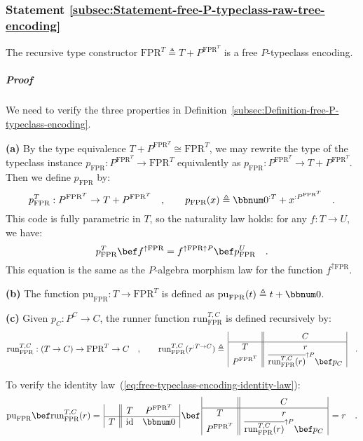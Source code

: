 \subsubsection{Statement \label{subsec:Statement-free-P-typeclass-raw-tree-encoding}\ref{subsec:Statement-free-P-typeclass-raw-tree-encoding}}

The recursive type constructor $\text{FPR}^{T}\triangleq T+P^{\text{FPR}^{T}}$
is a free $P$-typeclass encoding.

\subparagraph{Proof}

We need to verify the three properties in Definition~\ref{subsec:Definition-free-P-typeclass-encoding}.

\textbf{(a)} By the type equivalence $T+P^{\text{FPR}^{T}}\cong\text{FPR}^{T}$,
we may rewrite the type of the typeclass instance $p_{\text{FPR}}:P^{\text{FPR}^{T}}\rightarrow\text{FPR}^{T}$
equivalently as $p_{\text{FPR}}:P^{\text{FPR}^{T}}\rightarrow T+P^{\text{FPR}^{T}}$.
Then we define $p_{\text{FPR}}$ by:
\[
p_{\text{FPR}}^{T}:P^{\text{FPR}^{T}}\rightarrow T+P^{\text{FPR}^{T}}\quad,\quad\quad p_{\text{FPR}}(x)\triangleq\bbnum 0^{:T}+x^{:P^{\text{FPR}^{T}}}\quad.
\]
This code is fully parametric in $T$, so the naturality law holds:
for any $f:T\rightarrow U$, we have:
\[
p_{\text{FPR}}^{T}\bef f^{\uparrow\text{FPR}}=f^{\uparrow\text{FPR}\uparrow P}\bef p_{\text{FPR}}^{U}\quad.
\]
This equation is the same as the $P$-algebra morphism law for the
function $f^{\uparrow\text{FPR}}$.

\textbf{(b)} The function $\text{pu}_{\text{FPR}}:T\rightarrow\text{FPR}^{T}$
is defined as $\text{pu}_{\text{FPR}}(t)\triangleq t+\bbnum 0$.

\textbf{(c)} Given $p_{C}:P^{C}\rightarrow C$, the runner function
$\text{run}_{\text{FPR}}^{T,C}$ is defined recursively by:
\[
\text{run}_{\text{FPR}}^{T,C}:(T\rightarrow C)\rightarrow\text{FPR}^{T}\rightarrow C\quad,\quad\quad\text{run}_{\text{FPR}}^{T,C}(r^{:T\rightarrow C})\triangleq\,\begin{array}{|c||c|}
 & C\\
\hline T & r\\
P^{\text{FPR}^{T}} & \overline{\text{run}_{\text{FPR}}^{T,C}(r)}^{\uparrow P}\bef p_{C}
\end{array}\quad.
\]

To verify the identity law~(\ref{eq:free-typeclass-encoding-identity-law}):
\[
\text{pu}_{\text{FPR}}\bef\text{run}_{\text{FPR}}^{T,C}(r)=\,\begin{array}{|c||cc|}
 & T & P^{\text{FPR}^{T}}\\
\hline T & \text{id} & \bbnum 0
\end{array}\,\bef\,\begin{array}{|c||c|}
 & C\\
\hline T & r\\
P^{\text{FPR}^{T}} & \overline{\text{run}_{\text{FPR}}^{T,C}(r)}^{\uparrow P}\bef p_{C}
\end{array}\,=r\quad.
\]

